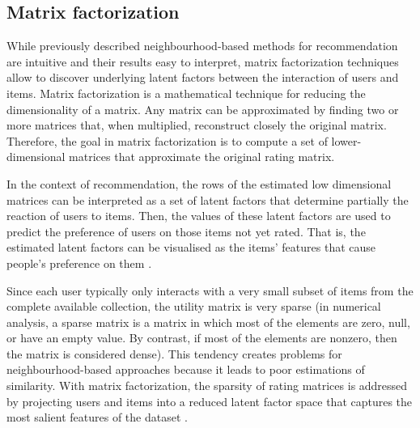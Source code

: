 



\subsection{Matrix factorization}\label{sub:matrix}
While previously described neighbourhood-based methods for recommendation are intuitive and their results easy to interpret, matrix factorization techniques allow to discover underlying latent factors between the interaction of users and items. 
Matrix factorization is a mathematical technique for reducing the dimensionality of a matrix. Any matrix can be approximated by finding two or more matrices that, when multiplied, reconstruct closely the original matrix. Therefore, the goal in matrix factorization is to compute a set of lower-dimensional matrices that approximate the original rating matrix. 

In the context of recommendation, the rows of the estimated low dimensional matrices can be interpreted as a set of latent factors that determine partially the reaction of users to items. Then, the values of these latent factors are used to predict the preference of users on those items not yet rated.
That is, the estimated latent factors can be visualised as the items' features that cause people's preference on them \autocite{koren09matrix}. 



Since each user typically only interacts with a very small subset of items from the complete available collection, the utility matrix is very sparse (in numerical analysis, a sparse matrix is a matrix in which most of the elements are zero, null, or have an empty value. By contrast, if most of the elements are nonzero, then the matrix is considered dense). This tendency creates problems for neighbourhood-based approaches because it leads to poor estimations of similarity. With matrix factorization, the sparsity of rating matrices is addressed by projecting users and items into a reduced latent factor space that captures the most salient features of the dataset \autocite{ricci15recommender}.

